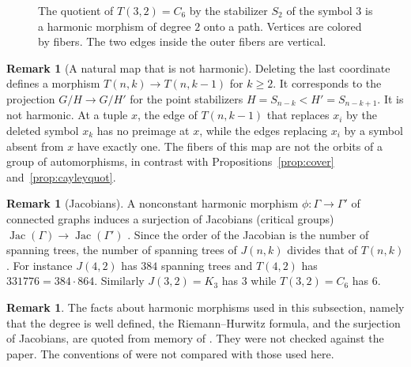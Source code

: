 \documentclass[12pt,letterpaper]{article}
\numberwithin{equation}{section}
\theoremstyle{definition}
\newtheorem{remark}[theorem]{Remark}
\newtheorem{vremark}{Remark}
\DeclareMathOperator{\Jac}{Jac}
\begin{document}
\begin{figure}[ht]\centering
{}
\caption{The quotient of $T(3,2)=C_6$ by the stabilizer $S_2$ of the symbol $3$ is a harmonic morphism of degree $2$ onto a path. Vertices are colored by fibers. The two edges inside the outer fibers are vertical.}\label{fig:fold}
\end{figure}
\begin{remark}[A natural map that is not harmonic]
Deleting the last coordinate defines a morphism $T(n,k)\to T(n,k-1)$ for $k\geq2$. It corresponds to the projection $G/H\to G/H'$ for the point stabilizers $H=S_{n-k}<H'=S_{n-k+1}$. It is not harmonic. At a tuple $x$, the edge of $T(n,k-1)$ that replaces $x_i$ by the deleted symbol $x_k$ has no preimage at $x$, while the edges replacing $x_i$ by a symbol absent from $x$ have exactly one. The fibers of this map are not the orbits of a group of automorphisms, in contrast with Propositions~\ref{prop:cover} and~\ref{prop:cayleyquot}.
\end{remark}
\begin{remark}[Jacobians]\label{rem:jacobians}
A nonconstant harmonic morphism $\phi\colon\Gamma\to\Gamma'$ of connected graphs induces a surjection of Jacobians (critical groups) $\Jac(\Gamma)\to\Jac(\Gamma')$ \cite{BN09}. Since the order of the Jacobian is the number of spanning trees, the number of spanning trees of $J(n,k)$ divides that of $T(n,k)$. For instance $J(4,2)$ has $384$ spanning trees and $T(4,2)$ has $331776=384\cdot864$. Similarly $J(3,2)=K_3$ has $3$ while $T(3,2)=C_6$ has $6$.
\end{remark}

\begin{vremark}\label{rem:bn}
The facts about harmonic morphisms used in this subsection, namely that the degree is well defined, the Riemann--Hurwitz formula, and the surjection of Jacobians, are quoted from memory of \cite{BN09}. They were not checked against the paper. The conventions of \cite{MJ26} were not compared with those used here.
\end{vremark}
\end{document}
